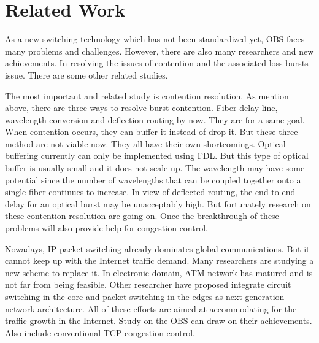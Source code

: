 \section{Related Work}
As a new switching technology which has not been standardized yet, OBS faces many problems and challenges. However, there are also many researchers and new achievements. In resolving the issues of contention and the associated loss bursts issue. There are some other related studies. 

The most important and related study is contention resolution. As mention above, there are three ways to resolve burst contention. Fiber delay line, wavelength conversion and deflection routing by now. They are for a same goal. When contention occurs, they can buffer it instead of drop it. But these three method are not viable now. They all have their own shortcomings. Optical buffering currently can only be implemented using FDL. But this type of optical buffer is
usually small and it does not scale up. The wavelength may have some potential since the number of wavelengths that can be coupled together onto a single fiber continues to increase. In view of deflected routing, the end-to-end delay for an optical burst may be unacceptably high. But fortunately research on these contention resolution are going on. Once the breakthrough of these problems will also provide help for congestion control. 

Nowadays, IP packet switching already dominates global communications. But it cannot keep up with the Internet traffic demand. Many researchers are studying a new scheme to replace it. In electronic domain, ATM network has matured and is not far from being feasible. Other researcher have proposed integrate circuit switching in the core and packet switching in the edges as next generation network architecture. All of these efforts are aimed at accommodating for the traffic growth in the Internet. Study on the OBS can draw on
their achievements. Also include conventional TCP congestion control. 
